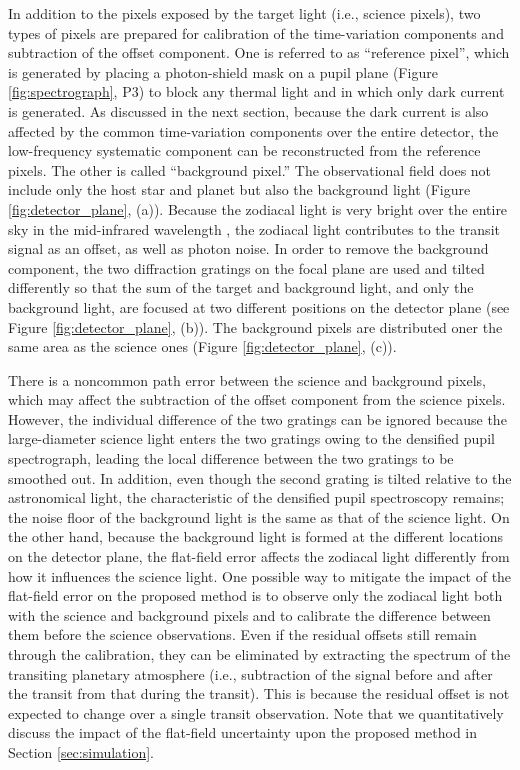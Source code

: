 \documentclass{aastex62}
\begin{document}
In addition to the pixels exposed by the target light (i.e., science pixels), two types of pixels are prepared for calibration of the time-variation components and subtraction of the offset component. One is referred to as “reference pixel”, which is generated by placing a photon-shield mask on a pupil plane (Figure \ref{fig:spectrograph}, P3) to block any thermal light and in which only dark current is generated. As discussed in the next section, because the dark current is also affected by the common time-variation components over the entire detector, the low-frequency systematic component can be reconstructed from the reference pixels. The other is called “background pixel.” The observational field does not include only the host star and planet but also the background light (Figure \ref{fig:detector_plane}, (a)). Because the zodiacal light is very bright over the entire sky in the mid-infrared wavelength \citep[e.g.,][]{1998ApJ...508...44K, 2016AJ....151...71K}, the zodiacal light contributes to the transit signal as an offset, as well as photon noise. In order to remove the background component, the two diffraction gratings on the focal plane are used and tilted differently so that the sum of the target and background light, and only the background light, are focused at two different positions on the detector plane (see Figure \ref{fig:detector_plane}, (b)). The background pixels are distributed oner the same area as the science ones (Figure \ref{fig:detector_plane}, (c)).

There is a noncommon path error between the science and background pixels, which may affect the subtraction of the offset component from the science pixels. However, the individual difference of the two gratings can be ignored because the large-diameter science light enters the two gratings owing to the densified pupil spectrograph, leading the local difference between the two gratings to be smoothed out. In addition, even though the second grating is tilted relative to the astronomical light, the characteristic of the densified pupil spectroscopy remains; the noise floor of the background light is the same as that of the science light. On the other hand, because the background light is formed at the different locations on the detector plane, the flat-field error affects the zodiacal light differently from how it influences the science light. One possible way to mitigate the impact of the flat-field error on the proposed method is to observe only the zodiacal light both with the science and background pixels and to calibrate the difference between them before the science observations. Even if the residual offsets still remain through the calibration, they can be eliminated by extracting the spectrum of the transiting planetary atmosphere (i.e., subtraction of the signal before and after the transit from that during the transit). This is because the residual offset is not expected to change over a single transit observation. Note that we quantitatively discuss the impact of the flat-field uncertainty upon the proposed method in Section \ref{sec:simulation}.
\end{document}
